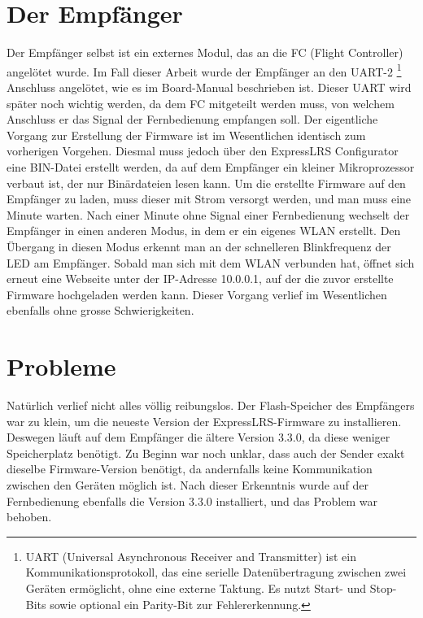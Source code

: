 \section{Der Empfänger}
Der Empfänger selbst ist ein externes Modul, das an die FC (Flight Controller) angelötet wurde. Im Fall dieser Arbeit wurde der Empfänger an den UART-2 \footnote{UART (Universal Asynchronous Receiver and Transmitter) ist ein Kommunikationsprotokoll, das eine serielle Datenübertragung zwischen zwei Geräten ermöglicht, ohne eine externe Taktung. Es nutzt Start- und Stop-Bits sowie optional ein Parity-Bit zur Fehlererkennung.\cite{UART}} Anschluss angelötet, wie es im Board-Manual\cite{BoardManual} beschrieben ist. Dieser UART wird später noch wichtig werden, da dem FC mitgeteilt werden muss, von welchem Anschluss er das Signal der Fernbedienung empfangen soll. Der eigentliche Vorgang zur Erstellung der Firmware ist im Wesentlichen identisch zum vorherigen Vorgehen. Diesmal muss jedoch über den ExpressLRS Configurator eine BIN-Datei erstellt werden, da auf dem Empfänger ein kleiner Mikroprozessor verbaut ist, der nur Binärdateien lesen kann. Um die erstellte Firmware auf den Empfänger zu laden, muss dieser mit Strom versorgt werden, und man muss eine Minute warten. Nach einer Minute ohne Signal einer Fernbedienung wechselt der Empfänger in einen anderen Modus, in dem er ein eigenes WLAN erstellt. Den Übergang in diesen Modus erkennt man an der schnelleren Blinkfrequenz der LED am Empfänger. Sobald man sich mit dem WLAN verbunden hat, öffnet sich erneut eine Webseite unter der IP-Adresse 10.0.0.1, auf der die zuvor erstellte Firmware hochgeladen werden kann. Dieser Vorgang verlief im Wesentlichen ebenfalls ohne grosse Schwierigkeiten.

\section{Probleme}
Natürlich verlief nicht alles völlig reibungslos. Der Flash-Speicher des Empfängers war zu klein, um die neueste Version der ExpressLRS-Firmware zu installieren. Deswegen läuft auf dem Empfänger die ältere Version 3.3.0, da diese weniger Speicherplatz benötigt. Zu Beginn war noch unklar, dass auch der Sender exakt dieselbe Firmware-Version benötigt, da andernfalls keine Kommunikation zwischen den Geräten möglich ist. Nach dieser Erkenntnis wurde auf der Fernbedienung ebenfalls die Version 3.3.0 installiert, und das Problem war behoben.




